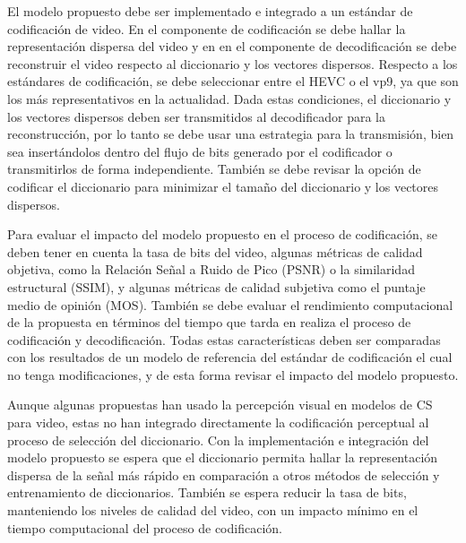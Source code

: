 El modelo propuesto debe ser implementado e integrado a un est\'andar de codificaci\'on de video. En el componente de codificaci\'on se debe hallar la representaci\'on dispersa del video y en en el componente de decodificaci\'on se debe reconstruir el video respecto al diccionario y los vectores dispersos. Respecto a los est\'andares de codificaci\'on, se debe seleccionar entre el HEVC o el vp9, ya que son los m\'as representativos en la actualidad. Dada estas condiciones, el diccionario y los vectores dispersos deben ser transmitidos al decodificador para la reconstrucci\'on, por lo tanto se debe usar una estrategia para la transmisi\'on, bien sea insert\'andolos dentro del flujo de bits generado por el codificador o transmitirlos de forma independiente. Tambi\'en se debe revisar la opci\'on de codificar el diccionario para minimizar el tama\~no del diccionario y los vectores dispersos. 

Para evaluar el impacto del modelo propuesto en el proceso de codificaci\'on, se deben tener en cuenta la tasa de bits del video, algunas m\'etricas de calidad objetiva, como la Relación Señal a Ruido de Pico (PSNR) o la similaridad estructural (SSIM), y algunas m\'etricas de calidad subjetiva como el puntaje medio de opini\'on (MOS). Tambi\'en se debe evaluar el rendimiento computacional de la propuesta en t\'erminos del tiempo que tarda en realiza el proceso de codificaci\'on y decodificaci\'on. Todas estas caracter\'isticas deben ser comparadas con los resultados de un modelo de referencia del est\'andar de codificaci\'on el cual no tenga modificaciones, y de esta forma revisar el impacto del modelo propuesto. 

Aunque algunas propuestas han usado la percepci\'on visual en modelos de CS para video, estas no han integrado directamente la codificaci\'on perceptual al proceso de selecci\'on del diccionario. Con la implementaci\'on e integraci\'on del modelo propuesto se espera que el diccionario permita hallar la representaci\'on dispersa de la se\~nal m\'as r\'apido en comparaci\'on a otros m\'etodos de selecci\'on y entrenamiento de diccionarios. Tambi\'en se espera reducir la tasa de bits, manteniendo los niveles de calidad del video, con un impacto m\'inimo en el tiempo computacional del proceso de codificaci\'on.

